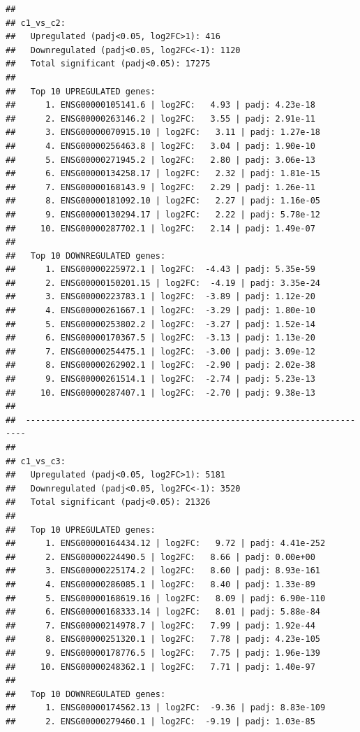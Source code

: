 \documentclass[
]{article}
\begin{document}
\begin{verbatim}
## 
## c1_vs_c2:
##   Upregulated (padj<0.05, log2FC>1): 416
##   Downregulated (padj<0.05, log2FC<-1): 1120
##   Total significant (padj<0.05): 17275
## 
##   Top 10 UPREGULATED genes:
##      1. ENSG00000105141.6 | log2FC:   4.93 | padj: 4.23e-18
##      2. ENSG00000263146.2 | log2FC:   3.55 | padj: 2.91e-11
##      3. ENSG00000070915.10 | log2FC:   3.11 | padj: 1.27e-18
##      4. ENSG00000256463.8 | log2FC:   3.04 | padj: 1.90e-10
##      5. ENSG00000271945.2 | log2FC:   2.80 | padj: 3.06e-13
##      6. ENSG00000134258.17 | log2FC:   2.32 | padj: 1.81e-15
##      7. ENSG00000168143.9 | log2FC:   2.29 | padj: 1.26e-11
##      8. ENSG00000181092.10 | log2FC:   2.27 | padj: 1.16e-05
##      9. ENSG00000130294.17 | log2FC:   2.22 | padj: 5.78e-12
##     10. ENSG00000287702.1 | log2FC:   2.14 | padj: 1.49e-07
## 
##   Top 10 DOWNREGULATED genes:
##      1. ENSG00000225972.1 | log2FC:  -4.43 | padj: 5.35e-59
##      2. ENSG00000150201.15 | log2FC:  -4.19 | padj: 3.35e-24
##      3. ENSG00000223783.1 | log2FC:  -3.89 | padj: 1.12e-20
##      4. ENSG00000261667.1 | log2FC:  -3.29 | padj: 1.80e-10
##      5. ENSG00000253802.2 | log2FC:  -3.27 | padj: 1.52e-14
##      6. ENSG00000170367.5 | log2FC:  -3.13 | padj: 1.13e-20
##      7. ENSG00000254475.1 | log2FC:  -3.00 | padj: 3.09e-12
##      8. ENSG00000262902.1 | log2FC:  -2.90 | padj: 2.02e-38
##      9. ENSG00000261514.1 | log2FC:  -2.74 | padj: 5.23e-13
##     10. ENSG00000287407.1 | log2FC:  -2.70 | padj: 9.38e-13
## 
##  ---------------------------------------------------------------------- 
## 
## c1_vs_c3:
##   Upregulated (padj<0.05, log2FC>1): 5181
##   Downregulated (padj<0.05, log2FC<-1): 3520
##   Total significant (padj<0.05): 21326
## 
##   Top 10 UPREGULATED genes:
##      1. ENSG00000164434.12 | log2FC:   9.72 | padj: 4.41e-252
##      2. ENSG00000224490.5 | log2FC:   8.66 | padj: 0.00e+00
##      3. ENSG00000225174.2 | log2FC:   8.60 | padj: 8.93e-161
##      4. ENSG00000286085.1 | log2FC:   8.40 | padj: 1.33e-89
##      5. ENSG00000168619.16 | log2FC:   8.09 | padj: 6.90e-110
##      6. ENSG00000168333.14 | log2FC:   8.01 | padj: 5.88e-84
##      7. ENSG00000214978.7 | log2FC:   7.99 | padj: 1.92e-44
##      8. ENSG00000251320.1 | log2FC:   7.78 | padj: 4.23e-105
##      9. ENSG00000178776.5 | log2FC:   7.75 | padj: 1.96e-139
##     10. ENSG00000248362.1 | log2FC:   7.71 | padj: 1.40e-97
## 
##   Top 10 DOWNREGULATED genes:
##      1. ENSG00000174562.13 | log2FC:  -9.36 | padj: 8.83e-109
##      2. ENSG00000279460.1 | log2FC:  -9.19 | padj: 1.03e-85

\end{verbatim}
\end{document}
